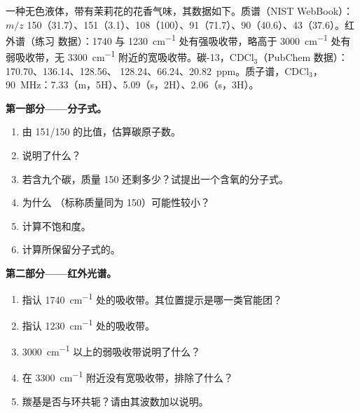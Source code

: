\begin{problem}
\label{pb:b2:structure-determination:1}
一种无色液体，带有茉莉花的花香气味，其数据如下。质谱（NIST
WebBook）：$m/z$ 150（31.7）、151（3.1）、108（100）、91（71.7）、90（40.6）、43（37.6）。红外谱（练习
数据）：1740 与 \qty{1230}{cm^{-1}} 处有强吸收带，略高于 \qty{3000}{cm^{-1}} 处有弱吸收带，无
\qty{3300}{cm^{-1}} 附近的宽吸收带。碳-13，CDCl$_3$（PubChem 数据）：170.70、136.14、128.56、
128.24、66.24、20.82~ppm。质子谱，CDCl$_3$，\qty{90}{MHz}：7.33（m，5H）、5.09（s，2H）、2.06（s，3H）。

\begin{center}
\end{center}

\medskip
\noindent\textbf{第一部分——分子式。}
\begin{enumerate}
  \item 由 151/150 的比值，估算碳原子数。
  \item {}说明了什么？
  \item 若含九个碳，质量 150 还剩多少？试提出一个含氧的分子式。
  \item 为什么 （标称质量同为 150）可能性较小？
  \item 计算不饱和度。
  \item 计算所保留分子式的。
\end{enumerate}

\medskip
\noindent\textbf{第二部分——红外光谱。}
\begin{enumerate}[resume]
  \item 指认 \qty{1740}{cm^{-1}} 处的吸收带。其位置提示是哪一类官能团？
  \item 指认 \qty{1230}{cm^{-1}} 处的吸收带。
  \item \qty{3000}{cm^{-1}} 以上的弱吸收带说明了什么？
  \item 在 \qty{3300}{cm^{-1}} 附近没有宽吸收带，排除了什么？
  \item 羰基是否与环共轭？请由其波数加以说明。
\end{enumerate}


\end{problem}
